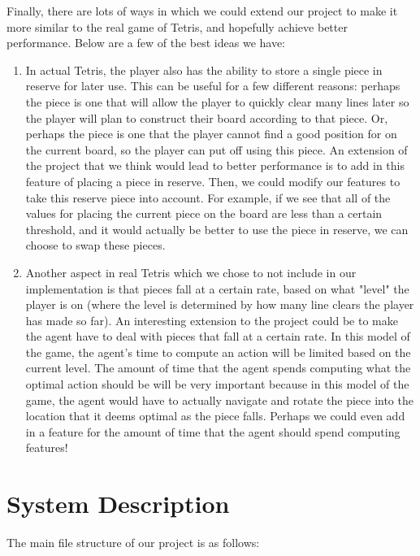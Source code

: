 \documentclass[11pt]{article}
\begin{document}
Finally, there are lots of ways in which we could extend our project to make it more similar to the real game of Tetris, and hopefully achieve better performance. Below are a few of the best ideas we have:
\begin{enumerate}
    \item In actual Tetris, the player also has the ability to store a single piece in reserve for later use. This can be useful for a few different reasons: perhaps the piece is one that will allow the player to quickly clear many lines later so the player will plan to construct their board according to that piece. Or, perhaps the piece is one that the player cannot find a good position for on the current board, so the player can put off using this piece. An extension of the project that we think would lead to better performance is to add in this feature of placing a piece in reserve. Then, we could modify our features to take this reserve piece into account. For example, if we see that all of the values for placing the current piece on the board are less than a certain threshold, and it would actually be better to use the piece in reserve, we can choose to swap these pieces.
    \item Another aspect in real Tetris which we chose to not include in our implementation is that pieces fall at a certain rate, based on what "level" the player is on (where the level is determined by how many line clears the player has made so far). An interesting extension to the project could be to make the agent have to deal with pieces that fall at a certain rate. In this model of the game, the agent's time to compute an action will be limited based on the current level. The amount of time that the agent spends computing what the optimal action should be will be very important because in this model of the game, the agent would have to actually navigate and rotate the piece into the location that it deems optimal as the piece falls. Perhaps we could even add in a feature for the amount of time that the agent should spend computing features!
\end{enumerate}

\appendix

\section{System Description}
The main file structure of our project is as follows:

\bigskip

\end{document}
